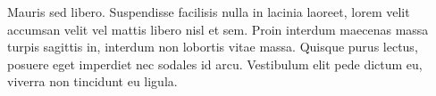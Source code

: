 \documentclass[11pt,a4paper,oneside,article]{memoir}
\begin{document}
Mauris sed libero. Suspendisse facilisis nulla in lacinia laoreet, lorem velit accumsan velit vel mattis libero nisl et sem. Proin interdum maecenas massa turpis sagittis in, interdum non lobortis vitae massa. Quisque purus lectus, posuere eget imperdiet nec sodales id arcu. Vestibulum elit pede dictum eu, viverra non tincidunt eu ligula.



\begin{flushleft}
\begin{singlespacing}

\end{singlespacing}
\end{flushleft}

\label{LastPage}~
\end{document}
